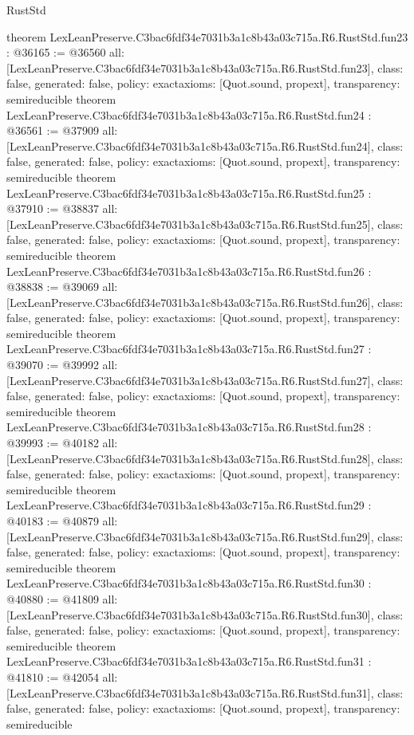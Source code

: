 \begin{lexlean}{RustStd}
\begin{coremodule}
{}
theorem LexLeanPreserve.C3bac6fdf34e7031b3a1c8b43a03c715a.R6.RustStd.fun23 : @36165 := @36560 {
  all: [LexLeanPreserve.C3bac6fdf34e7031b3a1c8b43a03c715a.R6.RustStd.fun23],
  class: false,
  generated: false,
  policy: exact{axioms: [Quot.sound, propext]},
  transparency: semireducible
}
theorem LexLeanPreserve.C3bac6fdf34e7031b3a1c8b43a03c715a.R6.RustStd.fun24 : @36561 := @37909 {
  all: [LexLeanPreserve.C3bac6fdf34e7031b3a1c8b43a03c715a.R6.RustStd.fun24],
  class: false,
  generated: false,
  policy: exact{axioms: [Quot.sound, propext]},
  transparency: semireducible
}
theorem LexLeanPreserve.C3bac6fdf34e7031b3a1c8b43a03c715a.R6.RustStd.fun25 : @37910 := @38837 {
  all: [LexLeanPreserve.C3bac6fdf34e7031b3a1c8b43a03c715a.R6.RustStd.fun25],
  class: false,
  generated: false,
  policy: exact{axioms: [Quot.sound, propext]},
  transparency: semireducible
}
theorem LexLeanPreserve.C3bac6fdf34e7031b3a1c8b43a03c715a.R6.RustStd.fun26 : @38838 := @39069 {
  all: [LexLeanPreserve.C3bac6fdf34e7031b3a1c8b43a03c715a.R6.RustStd.fun26],
  class: false,
  generated: false,
  policy: exact{axioms: [Quot.sound, propext]},
  transparency: semireducible
}
theorem LexLeanPreserve.C3bac6fdf34e7031b3a1c8b43a03c715a.R6.RustStd.fun27 : @39070 := @39992 {
  all: [LexLeanPreserve.C3bac6fdf34e7031b3a1c8b43a03c715a.R6.RustStd.fun27],
  class: false,
  generated: false,
  policy: exact{axioms: [Quot.sound, propext]},
  transparency: semireducible
}
theorem LexLeanPreserve.C3bac6fdf34e7031b3a1c8b43a03c715a.R6.RustStd.fun28 : @39993 := @40182 {
  all: [LexLeanPreserve.C3bac6fdf34e7031b3a1c8b43a03c715a.R6.RustStd.fun28],
  class: false,
  generated: false,
  policy: exact{axioms: [Quot.sound, propext]},
  transparency: semireducible
}
theorem LexLeanPreserve.C3bac6fdf34e7031b3a1c8b43a03c715a.R6.RustStd.fun29 : @40183 := @40879 {
  all: [LexLeanPreserve.C3bac6fdf34e7031b3a1c8b43a03c715a.R6.RustStd.fun29],
  class: false,
  generated: false,
  policy: exact{axioms: [Quot.sound, propext]},
  transparency: semireducible
}
theorem LexLeanPreserve.C3bac6fdf34e7031b3a1c8b43a03c715a.R6.RustStd.fun30 : @40880 := @41809 {
  all: [LexLeanPreserve.C3bac6fdf34e7031b3a1c8b43a03c715a.R6.RustStd.fun30],
  class: false,
  generated: false,
  policy: exact{axioms: [Quot.sound, propext]},
  transparency: semireducible
}
theorem LexLeanPreserve.C3bac6fdf34e7031b3a1c8b43a03c715a.R6.RustStd.fun31 : @41810 := @42054 {
  all: [LexLeanPreserve.C3bac6fdf34e7031b3a1c8b43a03c715a.R6.RustStd.fun31],
  class: false,
  generated: false,
  policy: exact{axioms: [Quot.sound, propext]},
  transparency: semireducible
}
\end{coremodule}
\end{lexlean}
